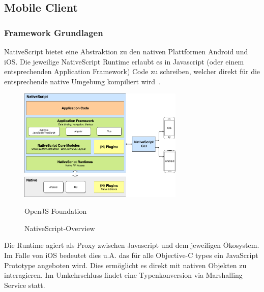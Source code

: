 \subsection{Mobile Client}\label{subsec:mobile-client}

\subsubsection{Framework Grundlagen}
NativeScript bietet eine Abstraktion zu den nativen Plattformen Android und iOS.
Die jeweilige NativeScript Runtime erlaubt es in Javascript (oder einem entsprechenden Application Framework) Code zu schreiben,
welcher direkt für die entsprechende native Umgebung kompiliert wird~\cite{ns-core-overview}.
\begin{figure}[h]
    \centering
    \label{fig:howNSWorks}
    \includegraphics[width=0.7\textwidth]{graphics/ns-common}\caption[NativeScript-Overview]{NativeScript-Overview}\textcopyright OpenJS Foundation
\end{figure}


Die Runtime agiert als Proxy zwischen Javascript und dem jeweiligen Ökosystem.
Im Falle von iOS bedeutet dies u.A. das für alle Objective-C types ein JavaScript Prototype angeboten wird.
Dies ermöglicht es direkt mit nativen Objekten zu interagieren.
Im Umkehrschluss findet eine Typenkonversion via Marshalling Service statt\cite{ns-ios-runtime}.



